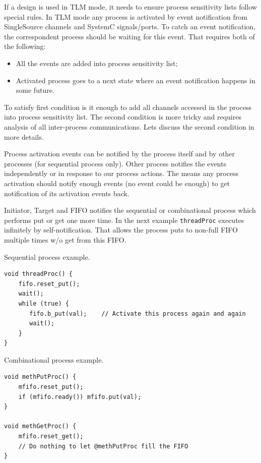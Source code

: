 If a design is used in TLM mode, it needs to ensure process sensitivity lists follow special rules. In TLM mode any process is activated by event notification from SingleSource channels and SystemC signals/ports. To catch an event notification, the correspondent process should be waiting for this event. That requires both of the following:
%
\begin{itemize}
\item All the events are added into process sensitivity list;
\item Activated process goes to a next state where an event notification happens in some future.
\end{itemize}

To satisfy first condition is it enough to add all channels accessed in the process into process sensitivity list. The second condition is more tricky and requires analysis of all inter-process communications. Lets discuss the second condition in more details.

Process activation events can be notified by the process itself and by other processes (for sequential process only). Other process notifies the events independently or in response to our process actions. The means any process activation should notify enough events (no event could be enough) to get notification of its activation events back.

Initiator, Target and FIFO notifies the sequential or combinational process which performs put or get one more time. In the next example {\tt threadProc} executes infinitely by self-notification. That allows the process puts to non-full FIFO multiple times w/o get from this FIFO.

Sequential process example.

\begin{lstlisting}[style=mycpp]
void threadProc() {
    fifo.reset_put();
    wait();
    while (true) {
       fifo.b_put(val);    // Activate this process again and again
       wait();
    }
}
\end{lstlisting}

Combinational process example.

\begin{lstlisting}[style=mycpp]
void methPutProc() {
    mfifo.reset_put();
    if (mfifo.ready()) mfifo.put(val);
}

void methGetProc() {
    mfifo.reset_get();
    // Do nothing to let @methPutProc fill the FIFO
}
\end{lstlisting}

